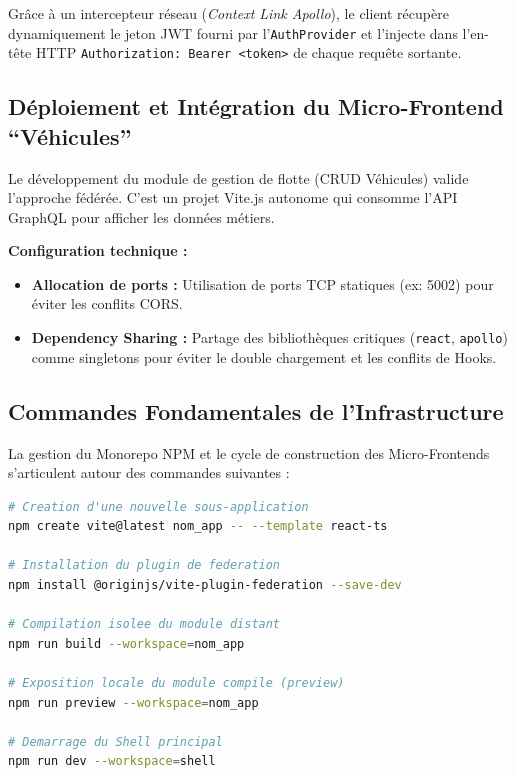 \documentclass[12pt,a4paper]{article}
\begin{document}
Gr\^{a}ce \`{a} un intercepteur r\'{e}seau (\textit{Context Link Apollo}), le client r\'{e}cup\`{e}re dynamiquement le jeton JWT fourni par l'\texttt{AuthProvider} et l'injecte dans l'en-t\^{e}te HTTP \texttt{Authorization: Bearer <token>} de chaque requ\^{e}te sortante.

\subsection{D\'{e}ploiement et Int\'{e}gration du Micro-Frontend ``V\'{e}hicules''}

Le d\'{e}veloppement du module de gestion de flotte (CRUD V\'{e}hicules) valide l'approche f\'{e}d\'{e}r\'{e}e. C'est un projet Vite.js autonome qui consomme l'API GraphQL pour afficher les donn\'{e}es m\'{e}tiers.

\begin{infobox}
\textbf{Configuration technique :}
\begin{itemize}
  \item \textbf{Allocation de ports :} Utilisation de ports TCP statiques (ex: 5002) pour \'{e}viter les conflits CORS.
  \item \textbf{Dependency Sharing :} Partage des biblioth\`{e}ques critiques (\texttt{react}, \texttt{apollo}) comme singletons pour \'{e}viter le double chargement et les conflits de Hooks.
\end{itemize}
\end{infobox}

\subsection{Commandes Fondamentales de l'Infrastructure}

La gestion du Monorepo NPM et le cycle de construction des Micro-Frontends s'articulent autour des commandes suivantes :

\begin{lstlisting}[language=bash, caption=Gestion du Monorepo et des MFEs]
# Creation d'une nouvelle sous-application
npm create vite@latest nom_app -- --template react-ts

# Installation du plugin de federation
npm install @originjs/vite-plugin-federation --save-dev

# Compilation isolee du module distant
npm run build --workspace=nom_app

# Exposition locale du module compile (preview)
npm run preview --workspace=nom_app

# Demarrage du Shell principal
npm run dev --workspace=shell
\end{lstlisting}
\end{document}
